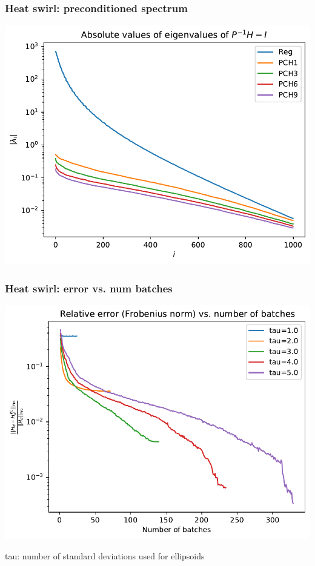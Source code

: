 \documentclass[10pt,final,xcolor=dvipsnames]{beamer}
\begin{document}
\begin{frame}
	\frametitle{Heat swirl: preconditioned spectrum}
	\begin{center}
		\includegraphics[width=0.75\columnwidth]{preconditioned_spectrum.pdf}
	\end{center}
\end{frame}
\begin{frame}
	\frametitle{Heat swirl: error vs. num batches}
	\begin{center}
		\includegraphics[width=0.75\columnwidth]{error_vs_num_batches_fro.pdf}
	\end{center}
	tau: number of standard deviations used for ellipsoids
\end{frame}
\end{document}
